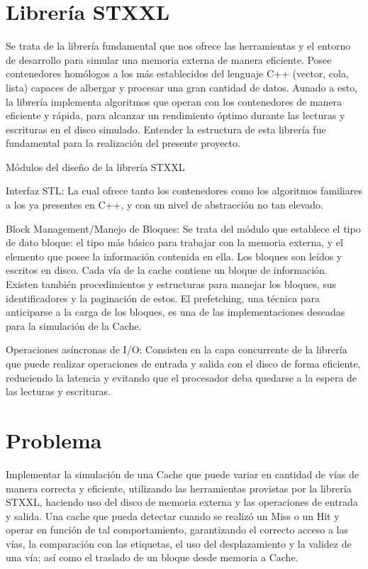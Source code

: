 \documentclass[11pt,letterpaper]{article}
\begin{document}
\section*{Librería STXXL}

Se trata de la librería fundamental que nos ofrece las herramientas y el entorno de desarrollo para simular una memoria externa de manera eficiente. Posee contenedores homólogos a los más establecidos del lenguaje C++ (vector, cola, lista) capaces de albergar y procesar una gran cantidad de datos. Aunado a esto, la librería implementa algoritmos que operan con los contenedores de manera eficiente y rápida, para alcanzar un rendimiento óptimo durante las lecturas y escrituras en el disco simulado. Entender la estructura de esta librería fue fundamental para la realización del presente proyecto.

Módulos del diseño de la librería STXXL

Interfaz STL: La cual ofrece tanto los contenedores como los algoritmos familiares a los ya presentes en C++, y con un nivel de abstracción no tan elevado.

Block Management/Manejo de Bloques: Se trata del módulo que establece el tipo de dato bloque: el tipo más básico para trabajar con la memoria externa, y el elemento que posee la información contenida en ella. Los bloques son leídos y escritos en disco. Cada vía de la cache contiene un bloque de información. Existen también procedimientos y estructuras para manejar los bloques, sus identificadores y la paginación de estos. El prefetching, una técnica para anticiparse a la carga de los bloques, es una de las implementaciones deseadas para la simulación de la Cache.

Operaciones asíncronas de I/O: Consisten en la capa concurrente de la librería que puede realizar operaciones de entrada y salida con el disco de forma eficiente, reduciendo la latencia y evitando que el procesador deba quedarse a la espera de las lecturas y escrituras.

\section*{Problema}

Implementar la simulación de una Cache que puede variar en cantidad de vías de manera correcta y eficiente, utilizando las herramientas provistas por la librería STXXL, haciendo uso del disco de memoria externa y las operaciones de entrada y salida. Una cache que pueda detectar cuando se realizó un Miss o un Hit y operar en función de tal comportamiento, garantizando el correcto acceso a las vías, la comparación con las etiquetas, el uso del desplazamiento y la validez de una vía; así como el traslado de un bloque desde memoria a Cache.
\end{document}
